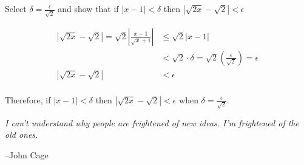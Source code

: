 \documentclass{exam}
\begin{document}
\begin{description}
  Select $\delta = \frac{\epsilon}{\sqrt{2}}$ and show that if $|x - 1| < \delta$ then $\left|\sqrt{2x} - \sqrt{2} \right| < \epsilon$

  \vspace{0.2 cm}

  \begin{align*}
    | \sqrt{2x} - \sqrt{2}| = \sqrt{2} \left| \frac{x - 1}{\sqrt{x} + 1} \right| &\leq  \sqrt{2} | x - 1| \\
        &< \sqrt{2} \cdot \delta = \sqrt{2} \left( \frac{\epsilon}{\sqrt{2}} \right) = \epsilon \\ 
    | \sqrt{2x} - \sqrt{2}| &< \epsilon \\ 
  \end{align*}

  Therefore, if $|x - 1| < \delta$ then $| \sqrt{2x} - \sqrt{2}| < \epsilon$ when $\delta = \frac{\epsilon}{\sqrt{2}}$.

  \end{description}
  \else

  \vspace{10 cm}

  {\em I can't understand why people are frightened of new ideas. I'm frightened of the old ones.}

  \vspace{.2 cm}

  \hspace{1 cm} --John Cage

  \fi
\end{document}
